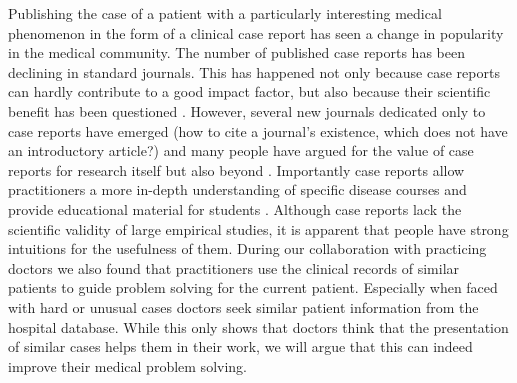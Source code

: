 Publishing the case of a patient with a particularly interesting medical phenomenon in the form of a clinical case report has seen a change in popularity in the medical community.
The number of published case reports has been declining in standard journals. This has happened not only because case reports can hardly contribute to a good impact factor, but also because their scientific benefit has been questioned \citep{Mason2001}. However, several new journals dedicated only to case reports have emerged \citep{Kidd2007}(how to cite a journal's existence, which does not have an introductory article?) and many people have argued for the value of case reports for research itself but also beyond \citep{Williams2003,Dib2008,Sandu2016}. Importantly case reports allow practitioners a more in-depth understanding of specific disease courses and provide educational material for students \citep{Nissen2014}. Although case reports lack the scientific validity of large empirical studies, it is apparent that people have strong intuitions for the usefulness of them. During our collaboration with practicing doctors we also found that practitioners use the clinical records of similar patients to guide problem solving for the current patient. Especially when faced with hard or unusual cases doctors seek similar patient information from the hospital database. While this only shows that doctors think that the presentation of similar cases helps them in their work, we will argue that this can indeed improve their medical problem solving. 

